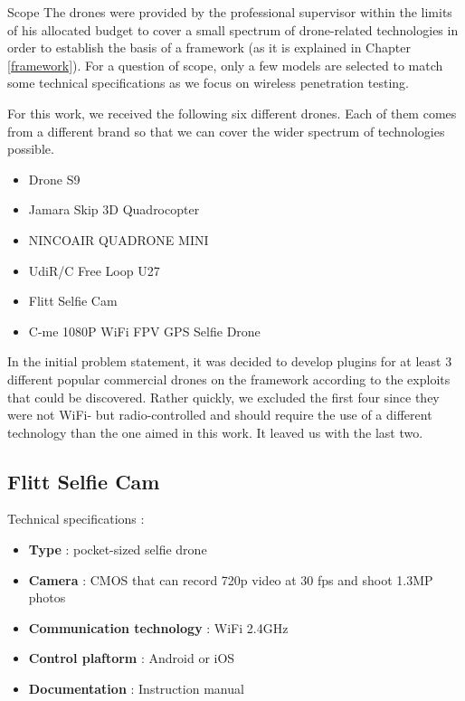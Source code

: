 \begin{chaptercover}{Scope}
The drones were provided by the professional supervisor within the limits of his allocated budget to cover a small spectrum of drone-related technologies in order to establish the basis of a framework (as it is explained in Chapter \ref{framework}). For a question of scope, only a few models are selected to match some technical specifications as we focus on wireless penetration testing.

For this work, we received the following six different drones. Each of them comes from a different brand so that we can cover the wider spectrum of technologies possible.
\begin{itemize}[itemsep=.1cm,topsep=.1cm]
  \item Drone S9
  \item Jamara Skip 3D Quadrocopter
  \item NINCOAIR QUADRONE MINI
  \item UdiR/C Free Loop U27 
  \item Flitt Selfie Cam
  \item C-me 1080P WiFi FPV GPS Selfie Drone
\end{itemize}

In the initial problem statement, it was decided to develop plugins for at least 3 different popular commercial drones on the framework according to the exploits that could be discovered. Rather quickly, we excluded the first four since they were not WiFi- but radio-controlled and should require the use of a different technology than the one aimed in this work. It leaved us with the last two.

\subsection{Flitt Selfie Cam}\label{subsec:flitt-selfie-cam}

Technical specifications :
\begin{itemize}[itemsep=.1cm,topsep=.1cm]
  \item \textbf{Type} : pocket-sized selfie drone
  \item \textbf{Camera} : CMOS that can record 720p video at 30 fps and shoot 1.3MP photos
  \item \textbf{Communication technology} : WiFi 2.4GHz
  \item \textbf{Control plaftorm} : Android or iOS
  \item \textbf{Documentation} : Instruction manual \cite{flitt-selfie-cam}
\end{itemize}


\end{chaptercover}
